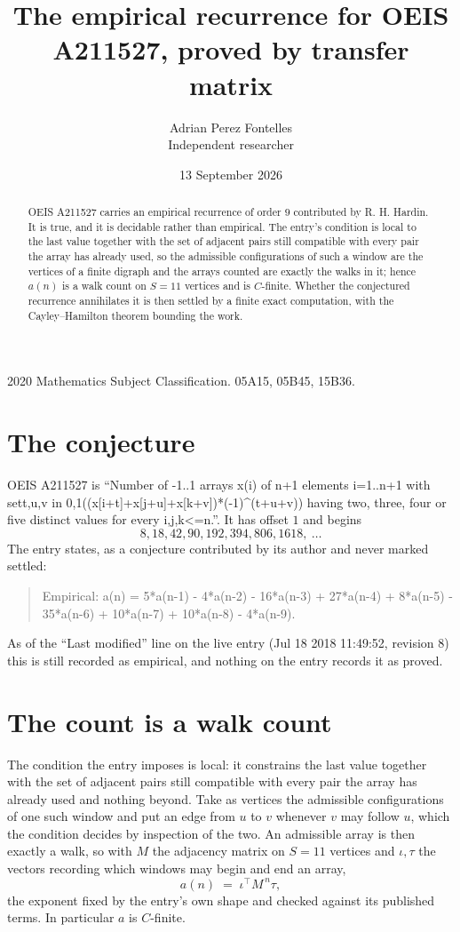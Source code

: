 \documentclass[11pt,a4paper]{article}
\title{The empirical recurrence for OEIS A211527, proved by transfer matrix}
\author{Adrian Perez Fontelles\\ \small Independent researcher}
\date{13 September 2026}
\theoremstyle{plain}
\theoremstyle{definition}
\begin{document}
\maketitle

\begin{abstract}
OEIS A211527 carries an empirical recurrence of order $9$ contributed by R. H. Hardin. It is
true, and it is decidable rather than empirical. The entry's condition is local to the last value together with the set of adjacent pairs still compatible with every pair the array has already used, so
the admissible configurations of such a window are the vertices of a finite digraph and the
arrays counted are exactly the walks in it; hence $a(n)$ is a walk count on $S=11$ vertices
and is $C$-finite. Whether the conjectured recurrence annihilates it is then settled by a
finite exact computation, with the Cayley--Hamilton theorem bounding the work.
\end{abstract}

\noindent\small 2020 Mathematics Subject Classification. 05A15, 05B45, 15B36.\normalsize

\section{The conjecture}

OEIS A211527 is ``Number of -1..1 arrays x(i) of n+1 elements i=1..n+1 with set{t,u,v in 0,1}((x[i+t]+x[j+u]+x[k+v])*(-1)\^{}(t+u+v)) having two, three, four or five distinct values for every i,j,k<=n.''. It has offset $1$ and begins
\[
8, 18, 42, 90, 192, 394, 806, 1618,\ \dots
\]
The entry states, as a conjecture contributed by its author and never marked settled:
\begin{quote}
Empirical: a(n) = 5*a(n-1) - 4*a(n-2) - 16*a(n-3) + 27*a(n-4) + 8*a(n-5) - 35*a(n-6) + 10*a(n-7) + 10*a(n-8) - 4*a(n-9).
\end{quote}
As of the ``Last modified'' line on the live entry (Jul 18 2018 11:49:52, revision 8) this is still
recorded as empirical, and nothing on the entry records it as proved.

\section{The count is a walk count}

The condition the entry imposes is local: it constrains the last value together with the set of adjacent pairs still compatible with every pair the array has already used and nothing beyond. Take as
vertices the admissible configurations of one such window and put an edge from $u$ to $v$
whenever $v$ may follow $u$, which the condition decides by inspection of the two. An
admissible array is then exactly a walk, so with $M$ the adjacency matrix on $S=11$ vertices
and $\iota,\tau$ the vectors recording which windows may begin and end an array,
\[
a(n)\;=\;\iota^{\!\top}M^{\,n}\tau ,
\]
the exponent fixed by the entry's own shape and checked against its published terms. In
particular $a$ is $C$-finite.
\end{document}
